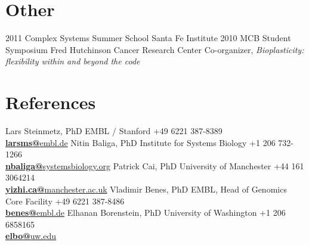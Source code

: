 \documentclass[usenames,dvipsnames]{friggeri-cv}
\begin{document}
\section{Other}
\begin{entrylist}
 \entry
    {2011}
    {Complex Systems Summer School}
    {Santa Fe Institute}
    {}
  \entry
    {2010}
    {MCB Student Symposium}
    {Fred Hutchinson Cancer Research Center}
    {Co-organizer, \emph{Bioplasticity: flexibility within and beyond the code}}
\end{entrylist}

\section{References}
\begin{entrylist}
\entry
    {}
    {Lars Steinmetz, PhD}
    {EMBL / Stanford}
    {+49 6221 387-8389\\
    \href{mailto:larsms@embl.de}{\textbf{larsms@}embl.de}}
    \entry
    {}
    {Nitin Baliga, PhD}
    {Institute for Systems Biology}
    {+1 206 732-1266\\
    \href{mailto:nbaliga@systemsbiology.org}{\textbf{nbaliga@}systemsbiology.org}}
     \entry
    {}
    {Patrick Cai, PhD}
    {University of Manchester}
    {+44 161 3064214\\
    \href{mailto:yizhi.ca@manchester.ac.uk}{\textbf{yizhi.ca@}manchester.ac.uk}}
     \entry
    {}
    {Vladimir Benes, PhD}
    {EMBL, Head of Genomics Core Facility}
    {+49 6221 387-8486\\
    \href{mailto:benes@embl.de}{\textbf{benes@}embl.de}}
     \entry
    {}
    {Elhanan Borenstein, PhD}
    {University of Washington}
    {+1 206 6858165\\
    \href{mailto:elbo@uw.edu}{\textbf{elbo@}uw.edu}}
\end{entrylist}
\end{document}
